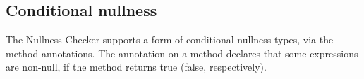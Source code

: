 % 


\subsection{Conditional nullness\label{conditional-nullness}}

The Nullness Checker supports a form of conditional nullness types, via the
 method annotations.
The annotation on a method declares that some expressions are non-null, if
the method returns true (false, respectively).

